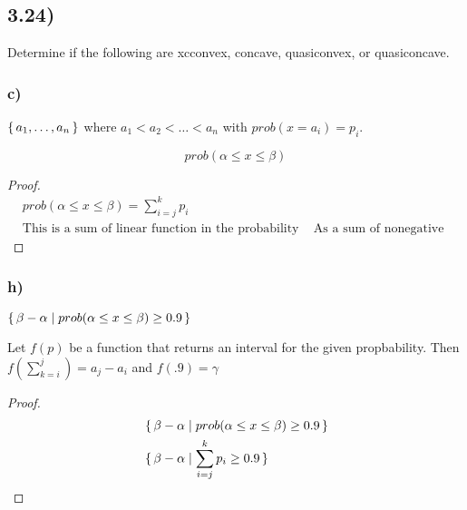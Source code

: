 \documentclass[12pt]{article}
\newenvironment{proposition}[2][Proposition]{\begin{trivlist}
\item[\hskip \labelsep {\bfseries #1}\hskip \labelsep {\bfseries #2.}]}{\end{trivlist}}
\begin{document}
\subsection*{3.24)}
Determine if the following are xcconvex, concave, quasiconvex, or quasiconcave.

\subsubsection*{c)}
$\set{a_1, \dots , a_n}$ where $a_1 < a_2 < \dots < a_n$ with $prob(x=a_i)=p_i$.

$$prob(\alpha \le x \le \beta)$$
\begin{proof}
\begin{align*}
& prob(\alpha \le x \le \beta) = \sum_{i=j}^{k}p_i\\
& \text{This is a sum of linear function in the probability space, each of which are convex and nonegative.}
& \text{As a sum of nonegative linear functions, the function is linear.}
\end{align*}
\end{proof}


\subsubsection*{h)}
$\set{\beta - \alpha | prob(\alpha \le x \le \beta) \ge 0.9}$

\begin{proposition}{}
Let $f(p)$ be a function that returns an interval for the given propbability.
Then $f(\sum_{k=i}^{j}) = a_j - a_i$ and $f(.9) = \gamma$
\end{proposition}
\begin{proof}
\begin{align*}
& \set{\beta - \alpha | prob(\alpha \le x \le \beta) \ge 0.9}\\
& \set{\beta - \alpha | \sum_{i=j}^{k}p_i \ge 0.9}\\



\end{align*}
\end{proof}
 
\end{document}
